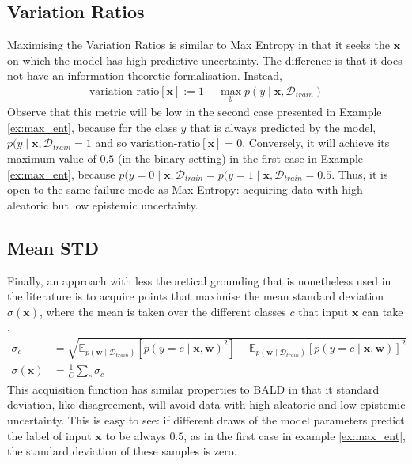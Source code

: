 \documentclass[11pt, a4paper, bibliography=totoc]{report}
\newcommand{\E}[2]{\mathbb{E}_{#1} \left[ #2 \right] }
\newcommand{\data}{\mathcal{D}}
\newcommand{\w}{\mathbf{w}}
\newcommand{\x}{\mathbf{x}}
\begin{document}
\subsection{Variation Ratios}
Maximising the Variation Ratios \cite{freeman1965elementary} is similar to Max Entropy in that it seeks the $ \x $ on which the model has high predictive uncertainty. The difference is that it does not have an information theoretic formalisation. Instead,
\begin{align*}
\text{variation-ratio}[\x] := 1 - \max_y p(y \mid \x, \data_{train})
\end{align*}
Observe that this metric will be low in the second case presented in Example \ref{ex:max_ent}, because for the class $ y $ that is always predicted by the model, $ p(y \mid \x, \data_{train} = 1 $ and so $ \text{variation-ratio}[\x] = 0 $. Conversely, it will achieve its maximum value of $ 0.5 $ (in the binary setting) in the first case in Example \ref{ex:max_ent}, because $ p(y=0 \mid \x, \data_{train} = p(y=1 \mid \x, \data_{train} = 0.5 $. Thus, it is open to the same failure mode as Max Entropy: acquiring data with high aleatoric but low epistemic uncertainty.

\subsection{Mean STD}
Finally, an approach with less theoretical grounding that is nonetheless used in the literature is to acquire points that maximise the mean standard deviation $ \sigma(\x) $, where the mean is taken over the different classes $ c $ that input $ \x $ can take \cite{kampffmeyer2016semantic, kendall2015bayesian}.
\begin{align*}
\sigma_c &= \sqrt{\E{p(\w \mid \data_{train})}{p(y=c \mid \x, \w)^2} - \E{p(\w \mid \data_{train})}{p(y=c \mid \x, \w)}^2 } \\
\sigma(\x) &= \frac{1}{C} \sum_c \sigma_c
\end{align*}
This acquisition function has similar properties to BALD in that it standard deviation, like disagreement, will avoid data with high aleatoric and low epistemic uncertainty. This is easy to see: if different draws of the model parameters predict the label of input $ \x $ to be always $ 0.5 $, as in the first case in example \ref{ex:max_ent}, the standard deviation of these samples is zero.
\end{document}
